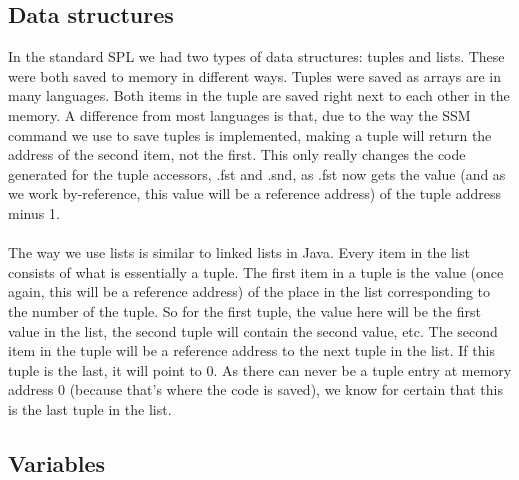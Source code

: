 \documentclass[10pt,a4paper]{article}
\begin{document}
\subsection{Data structures}
In the standard SPL we had two types of data structures: tuples and lists. These were both saved to memory in different ways. Tuples were saved as arrays are in many languages. Both items in the tuple are saved right next to each other in the memory. A difference from most languages is that, due to the way the SSM command we use to save tuples is implemented, making a tuple will return the address of the second item, not the first. This only really changes the code generated for the tuple accessors, .fst and .snd, as .fst now gets the value (and as we work by-reference, this value will be a reference address) of the tuple address minus 1.\\
\\
The way we use lists is similar to linked lists in Java. Every item in the list consists of what is essentially a tuple. The first item in a tuple is the value (once again, this will be a reference address) of the place in the list corresponding to the number of the tuple. So for the first tuple, the value here will be the first value in the list, the second tuple will contain the second value, etc. The second item in the tuple will be a reference address to the next tuple in the list. If this tuple is the last, it will point to 0. As there can never be a tuple entry at memory address 0 (because that's where the code is saved), we know for certain that this is the last tuple in the list.
\subsection{Variables}
\end{document}
